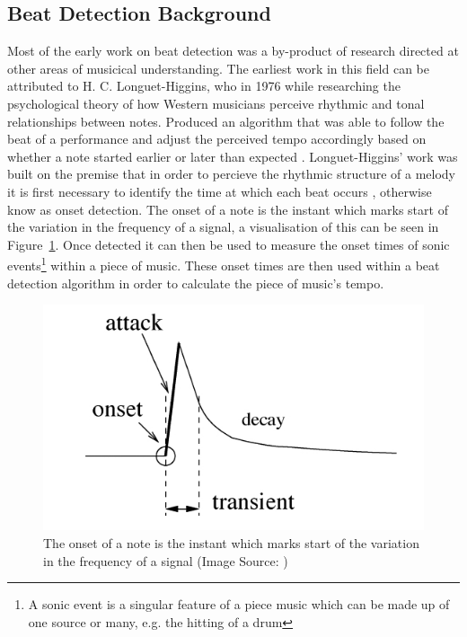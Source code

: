 \documentclass[a4paper, 11pt]{article}
\begin{document}
\subsection{Beat Detection Background}
Most of the early work on beat detection was a by-product of research directed at other areas of musicical understanding. The earliest work in this field can be attributed to H. C. Longuet-Higgins, who in 1976 while researching the psychological theory of how Western musicians perceive rhythmic and tonal relationships between notes. Produced an algorithm that was able to follow the beat of a performance and adjust the perceived tempo accordingly based on whether a note started earlier or later than expected \cite{allen-danneburg}. Longuet-Higgins' work was built on the premise that in order to percieve the rhythmic structure of a melody it is first necessary to identify the time at which each beat occurs \cite{longeut1}, otherwise know as onset detection. The onset of a note is the instant which marks start of the variation in the frequency of a signal, a visualisation of this can be seen in Figure~\ref{fig: Onset}. Once detected it can then be used to measure the onset times of sonic events\footnote{A sonic event is a singular feature of a piece music which can be made up of one source or many\cite{sonic}, e.g. the hitting of a drum} within a piece of music\cite{mirex-onset}. These onset times are then used within a beat detection algorithm in order to calculate the piece of music's tempo. 

\begin{figure}[h]
	\centering
	\includegraphics[scale=0.40]{Onset}
	\caption{The onset of a note is the instant which marks start of the variation in the frequency of a signal (Image Source: \cite{onset-tut})}
	\label{fig: Onset}
\end{figure}
\end{document}
